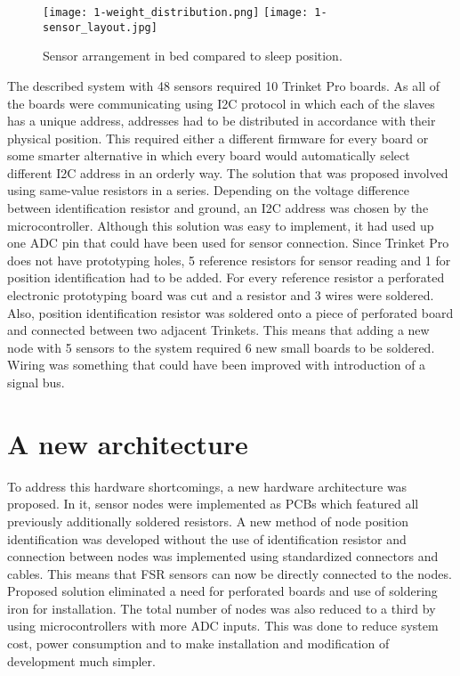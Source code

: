 \begin{figure}[h]
  \begin{center}
    \texttt{[image: 1-weight\_distribution.png]}
    \texttt{[image: 1-sensor\_layout.jpg]}
  \end{center}
  \caption{Sensor arrangement in bed compared to sleep position.}
  \label{fig:sensor-layout}
\end{figure}

The described system with 48 sensors required 10 Trinket Pro boards. As all of the boards were communicating using \ac{I2C} protocol in which each of the slaves has a unique address, addresses had to be distributed in accordance with their physical position. This required either a different firmware for every board or some smarter alternative in which every board would automatically select different I2C address in an orderly way. The solution that was proposed involved using same-value resistors in a series. Depending on the voltage difference between identification resistor and ground, an \ac{I2C} address was chosen by the microcontroller. Although this solution was easy to implement, it had used up one ADC pin that could have been used for sensor connection. Since Trinket Pro does not have prototyping holes, 5 reference resistors for sensor reading and 1 for position identification had to be added. For every reference resistor a perforated electronic prototyping board was cut and a resistor and 3 wires were soldered. Also, position identification resistor was soldered onto a piece of perforated board and connected between two adjacent Trinkets. This means that adding a new node with 5 sensors to the system required 6 new small boards to be soldered. Wiring was something that could have been improved with introduction of a signal bus.


\section{A new architecture}

To address this hardware shortcomings, a new hardware architecture was proposed. In it, sensor nodes were implemented as \ac{PCB}s which featured all previously additionally soldered resistors. A new method of node position identification was developed without the use of identification resistor and connection between nodes was implemented using standardized connectors and cables. This means that \ac{FSR} sensors can now be directly connected to the nodes. Proposed solution eliminated a need for perforated boards and use of soldering iron for installation. The total number of nodes was also reduced to a third by using microcontrollers with more \ac{ADC} inputs. This was done to reduce system cost, power consumption and to make installation and modification of development much simpler.

